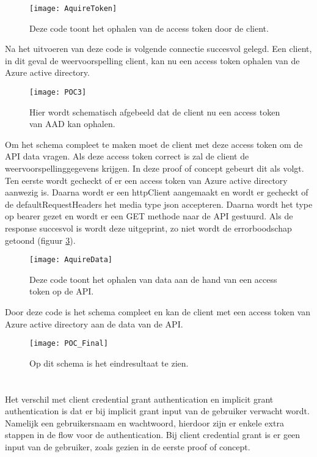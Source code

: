 \begin{figure}[H]
	\centering
	\texttt{[image: AquireToken]} 
	\caption[AuthConfig]{Deze code toont het ophalen van de access token door de client.}
	\label{fig:aquireToken}
\end{figure}\newpage
Na het uitvoeren van deze code is volgende connectie succesvol gelegd. Een client, in dit geval de weervoorspelling client, kan nu een access token ophalen van de Azure active directory.
\begin{figure}[H]
	\centering
	\texttt{[image: POC3]} 
	\caption[POC3]{Hier wordt schematisch afgebeeld dat de client nu een access token van AAD kan ophalen.}
	\label{fig:poc3}
\end{figure}
Om het schema compleet te maken moet de client met deze access token om de API data vragen. Als deze access token correct is zal de client de weervoorspellinggegevens krijgen. In deze proof of concept gebeurt dit als volgt.\newline
Ten eerste wordt gecheckt of er een access token van Azure active directory aanwezig is. Daarna wordt er een httpClient aangemaakt en wordt er gecheckt of de defaultRequestHeaders het media type json accepteren. Daarna wordt het  type op bearer gezet en wordt er een GET methode naar de API gestuurd. Als de response succesvol is wordt deze uitgeprint, zo niet wordt de errorboodschap getoond (figuur \ref{fig:aquireData}).
\begin{figure}[H]
	\centering
	\texttt{[image: AquireData]} 
	\caption[AquireData]{Deze code toont het ophalen van data aan de hand van een access token op de API.}
	\label{fig:aquireData}
\end{figure}\newpage
Door deze code is het schema compleet en kan de client met een access token van Azure active directory aan de data van de API.
\begin{figure}[H]
	\centering
	\texttt{[image: POC\_Final]} 
	\caption[POCFinal2]{Op dit schema is het eindresultaat te zien.}
	\label{fig:pocfinal2}
\end{figure}
\section{}
\label{sec:Microsift_signon}
Het verschil met client credential grant authentication en implicit grant authentication is dat er bij implicit grant input van de gebruiker verwacht wordt. Namelijk een gebruikersnaam en wachtwoord, hierdoor zijn er enkele extra stappen in de flow voor de authentication. Bij client credential grant is er geen input van de gebruiker, zoals gezien in de eerste proof of concept.
